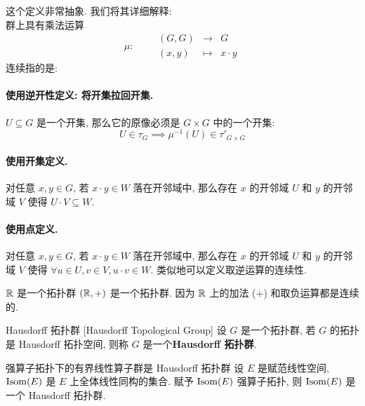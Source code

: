         \begin{rmk}
            [Dedicatia]
            这个定义非常抽象. 我们将其详细解释: \\
            群上具有乘法运算 
            \[\mu:\qquad\begin{matrix}
                (G, G) & \to & G\\
                (x,y) & \mapsto & x\cdot y
            \end{matrix} \]
            连续指的是: 
            \paragraph{使用逆开性定义: 将开集拉回开集.} \(U\subseteq G\) 是一个开集, 那么它的原像必须是 \(G\times G\) 中的一个开集:
            \[U\in\tau_G \implies \mu^{-1}(U)\in\tau'_{G\times G}\]
            \paragraph{使用开集定义.} 对任意 \(x,y\in G\), 若 \(x\cdot y\in W\) 落在开邻域中, 那么存在 \(x\) 的开邻域 \(U\) 和 \(y\) 的开邻域 \(V\) 使得 \(U\cdot V \subseteq W\). 
            \paragraph{使用点定义.} 对任意 \(x,y\in G\), 若 \(x\cdot y\in W\) 落在开邻域中, 那么存在 \(x\) 的开邻域 \(U\) 和 \(y\) 的开邻域 \(V\) 使得 \(\forall u\in U, v\in V, u\cdot v \in W\). 
            类似地可以定义取逆运算的连续性.
        \end{rmk}

        \begin{ins}
            {\(\operatorname{\mathbb{R}}\) 是一个拓扑群}
            \((\operatorname{\mathbb{R}},+)\) 是一个拓扑群. 因为 \(\operatorname{\mathbb{R}}\) 上的加法 (\(+\)) 和取负运算都是连续的.
        \end{ins}

        \begin{dfn}
            {Hausdorff 拓扑群}
            [Hausdorff Topological Group]
            设 \(G\) 是一个拓扑群, 若 \(G\) 的拓扑是 Hausdorff 拓扑空间, 则称 \(G\) 是一个\textbf{Hausdorff 拓扑群}.
        \end{dfn}

        \begin{ins}
            {强算子拓扑下的有界线性算子群是 Hausdorff 拓扑群}
            设 \(E\) 是赋范线性空间, \(\operatorname{Isom}(E)\) 是 \(E\) 上全体线性同构的集合. 赋予 \(\operatorname{Isom}(E)\) 强算子拓扑, 则 \(\operatorname{Isom}(E)\) 是一个 Hausdorff 拓扑群.
        \end{ins}

